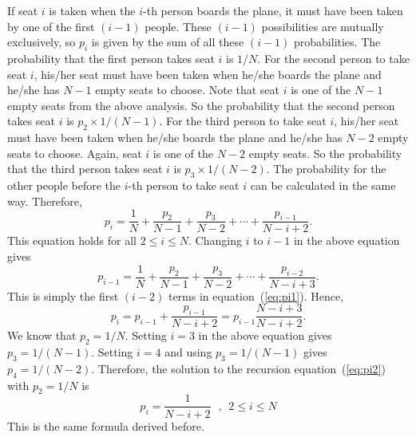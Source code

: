 \documentclass[11pt]{article}
\newcommand{\beq}{\begin{equation}}
\newcommand{\eeq}{\end{equation}}
\numberwithin{equation}{section}
\begin{document}
If seat $i$ is taken when the $i$-th person boards the plane, it must have been 
taken by one of the first $(i-1)$ people.
These $(i-1)$ possibilities are mutually exclusively, 
so $p_i$ is given by the sum of all these $(i-1)$ probabilities. The probability 
that the first person takes seat $i$ is $1/N$. For the second person to take seat $i$, 
his/her seat must have been taken when he/she boards the plane and he/she has $N-1$ 
empty seats to choose. Note that seat $i$ is one of the $N-1$ empty seats from the 
above analysis. So the probability that the second person takes seat $i$ is 
$p_2 \times 1/(N-1)$. For the third person to take seat $i$, 
his/her seat must have been taken when he/she boards the plane and he/she has 
$N-2$ empty seats to choose. Again, seat $i$ is one of the $N-2$ empty seats. 
So the  probability that the third person takes seat $i$ is 
$p_3 \times 1/(N-2)$. The probability for the other people before the $i$-th 
person to take seat $i$ can be calculated in the same way. Therefore, 
\beq
  p_i = \frac{1}{N} + \frac{p_2}{N-1} + \frac{p_3}{N-2} + \cdots 
+ \frac{p_{i-1}}{N-i+2} .
\label{eq:pi1}
\eeq
This equation holds for all $2 \leq i \leq N$. Changing $i$ to $i-1$ in 
the above equation gives 
\beq
  p_{i-1} = \frac{1}{N} + \frac{p_2}{N-1} + \frac{p_3}{N-2} + \cdots
+ \frac{p_{i-2}}{N-i+3} .
\eeq
This is simply the first $(i-2)$ terms in equation~(\ref{eq:pi1}). Hence, 
\beq
  p_i = p_{i-1} + \frac{p_{i-1}}{N-i+2} = p_{i-1} \frac{N-i+3}{N-i+2} .
\label{eq:pi2}
\eeq
We know that $p_2=1/N$. Setting $i=3$ in the above equation gives $p_3=1/(N-1)$. Setting 
$i=4$ and using $p_3=1/(N-1)$ gives $p_4=1/(N-2)$. Therefore, the solution 
to the recursion equation~(\ref{eq:pi2}) with $p_2=1/N$ is 
\beq
  \boxed{p_i = \frac{1}{N-i+2} \ \ \ , \ \ 2 \leq i \leq N }
\eeq
This is the same formula derived before.
\end{document}

